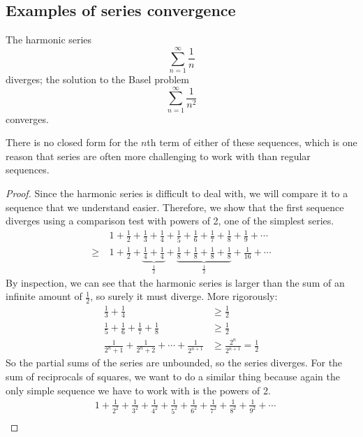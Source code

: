 \subsection{Examples of series convergence}
\begin{proposition}
	The harmonic series
	\[
		\sum_{n=1}^\infty \frac 1 n
	\]
	diverges; the solution to the Basel problem
	\[
		\sum_{n=1}^\infty \frac 1 {n^2}
	\]
	converges.
\end{proposition}
There is no closed form for the \(n\)th term of either of these sequences, which is one reason that series are often more challenging to work with than regular sequences.
\begin{proof}
	Since the harmonic series is difficult to deal with, we will compare it to a sequence that we understand easier.
	Therefore, we show that the first sequence diverges using a comparison test with powers of 2, one of the simplest series.
	\begin{align*}
		       & 1 + \frac 1 2 + \frac 1 3 + \frac 1 4 + \frac 1 5 + \frac 1 6 + \frac 1 7 + \frac 1 8 + \frac 1 9 + \cdots                                                      \\
		\geq\  & 1 + \frac 1 2 + \underbrace{\frac 1 4 + \frac 1 4}_{\frac 1 2} + \underbrace{\frac 1 8 + \frac 1 8 + \frac 1 8 + \frac 1 8}_{\frac 1 2} + \frac 1 {16} + \cdots
	\end{align*}
	By inspection, we can see that the harmonic series is larger than the sum of an infinite amount of \(\frac 1 2\), so surely it must diverge.
	More rigorously:
	\begin{align*}
		\frac 1 3 + \frac 1 4                                              & \geq \frac 1 2                         \\
		\frac 1 5 + \frac 1 6 + \frac 1 7 + \frac 1 8                      & \geq \frac 1 2                         \\
		\frac{1}{2^n + 1} + \frac{1}{2^n + 2} + \cdots + \frac{1}{2^{n+1}} & \geq \frac{2^n}{2^{n+1}} = \frac{1}{2}
	\end{align*}
	So the partial sums of the series are unbounded, so the series diverges.
	For the sum of reciprocals of squares, we want to do a similar thing because again the only simple sequence we have to work with is the powers of 2.
	\begin{align*}
		       & 1 + \frac 1 {2^2} + \frac 1 {3^2} + \frac 1 {4^2} + \frac 1 {5^2} + \frac 1 {6^2} + \frac 1 {7^2} + \frac 1 {8^2} + \frac 1 {9^2} + \cdots                                                           \\

\end{align*}
\end{proof}
